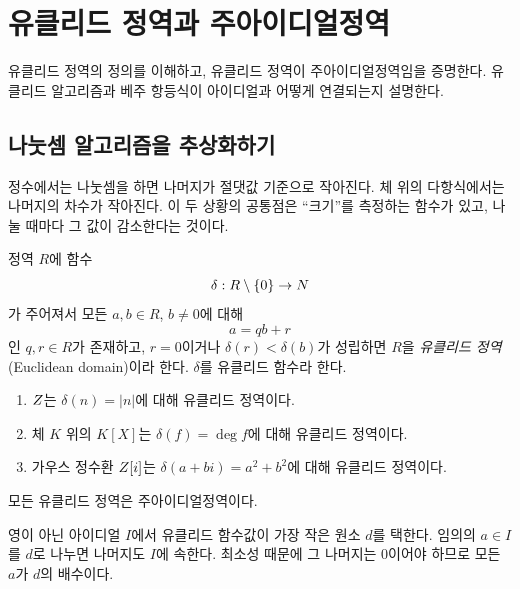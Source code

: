 \clearpage
\section{유클리드 정역과 주아이디얼정역}
\label{sec:ring-euclidean-pid}

\begin{learninggoal}
유클리드 정역의 정의를 이해하고, 유클리드 정역이 주아이디얼정역임을 증명한다. 유클리드 알고리즘과 베주 항등식이 아이디얼과 어떻게 연결되는지 설명한다.
\end{learninggoal}

\subsection{나눗셈 알고리즘을 추상화하기}

정수에서는 나눗셈을 하면 나머지가 절댓값 기준으로 작아진다. 체 위의 다항식에서는 나머지의 차수가 작아진다. 이 두 상황의 공통점은 ``크기''를 측정하는 함수가 있고, 나눌 때마다 그 값이 감소한다는 것이다.

\begin{definition}[유클리드 정역]
정역 $R$에 함수
\[
  \delta:R\setminus\{0\}\to N
\]
가 주어져서 모든 $a,b\in R$, $b\ne0$에 대해
\[
  a=qb+r
\]
인 $q,r\in R$가 존재하고, $r=0$이거나 $\delta(r)<\delta(b)$가 성립하면 $R$을 \emph{유클리드 정역}(Euclidean domain)이라 한다. $\delta$를 유클리드 함수라 한다.
\end{definition}

\begin{example}
\begin{enumerate}[label=(\alph*)]
  \item $Z$는 $\delta(n)=|n|$에 대해 유클리드 정역이다.
  \item 체 $K$ 위의 $K[X]$는 $\delta(f)=\deg f$에 대해 유클리드 정역이다.
  \item 가우스 정수환 $Z[i]$는 $\delta(a+bi)=a^2+b^2$에 대해 유클리드 정역이다.
\end{enumerate}
\end{example}

\begin{theorem}
모든 유클리드 정역은 주아이디얼정역이다.
\end{theorem}

\begin{proofidea}
영이 아닌 아이디얼 $I$에서 유클리드 함수값이 가장 작은 원소 $d$를 택한다. 임의의 $a\in I$를 $d$로 나누면 나머지도 $I$에 속한다. 최소성 때문에 그 나머지는 $0$이어야 하므로 모든 $a$가 $d$의 배수이다.
\end{proofidea}

